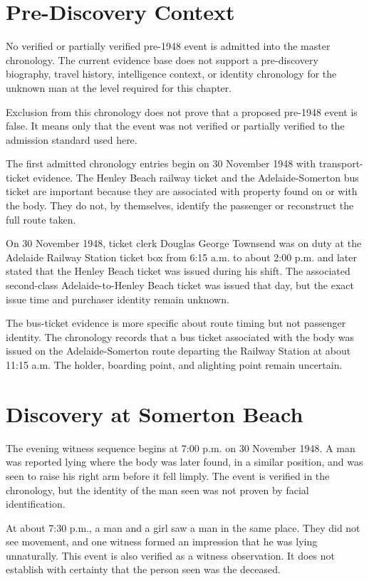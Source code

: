 \section{Pre-Discovery Context}

No verified or partially verified pre-1948 event is admitted into the master chronology. The current evidence base does not support a pre-discovery biography, travel history, intelligence context, or identity chronology for the unknown man at the level required for this chapter.

Exclusion from this chronology does not prove that a proposed pre-1948 event is false. It means only that the event was not verified or partially verified to the admission standard used here.

The first admitted chronology entries begin on 30 November 1948 with transport-ticket evidence. The Henley Beach railway ticket and the Adelaide-Somerton bus ticket are important because they are associated with property found on or with the body. They do not, by themselves, identify the passenger or reconstruct the full route taken.

On 30 November 1948, ticket clerk Douglas George Townsend was on duty at the Adelaide Railway Station ticket box from 6:15 a.m. to about 2:00 p.m. and later stated that the Henley Beach ticket was issued during his shift. The associated second-class Adelaide-to-Henley Beach ticket was issued that day, but the exact issue time and purchaser identity remain unknown.

The bus-ticket evidence is more specific about route timing but not passenger identity. The chronology records that a bus ticket associated with the body was issued on the Adelaide-Somerton route departing the Railway Station at about 11:15 a.m. The holder, boarding point, and alighting point remain uncertain.

\section{Discovery at Somerton Beach}

The evening witness sequence begins at 7:00 p.m. on 30 November 1948. A man was reported lying where the body was later found, in a similar position, and was seen to raise his right arm before it fell limply. The event is verified in the chronology, but the identity of the man seen was not proven by facial identification.

At about 7:30 p.m., a man and a girl saw a man in the same place. They did not see movement, and one witness formed an impression that he was lying unnaturally. This event is also verified as a witness observation. It does not establish with certainty that the person seen was the deceased.

